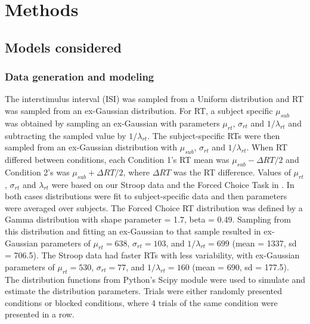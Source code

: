 \documentclass[titlepage,12pt] {article}
\begin{document}
\section*{Methods}

\subsection*{Models considered}

\subsubsection*{Data generation and modeling} 


The interstimulus interval (ISI) was sampled from a Uniform distribution and RT was sampled from an ex-Gaussian distribution.  For RT, a subject specific $\mu_{sub}$ was obtained by sampling an ex-Gaussian with parameters $\mu_{rt}$, $\sigma_{rt}$ and $1/\lambda_{rt}$ and subtracting the sampled value by $1/\lambda_{rt}$.  The subject-specific RTs were then sampled from an ex-Gaussian distribution with $\mu_{sub}$, $\sigma_{rt}$ and $1/\lambda_{rt}$.  
When RT differed between conditions, each Condition 1's RT mean was $\mu_{sub} - \Delta RT/2$ and Condition 2's was $\mu_{sub}+\Delta RT/2$, where $\Delta RT$ was the RT difference.  Values of $\mu_{rt}$, $\sigma_{rt}$ and $\lambda_{rt}$ were based on our Stroop data and the Forced Choice Task in \citet{grinband_detection_2008}.  In both cases distributions were fit to subject-specific data and then parameters were averaged over subjects.  The Forced Choice RT distribution was defined by a Gamma distribution with shape parameter = 1.7, beta = 0.49.  Sampling from this distribution and fitting an ex-Gaussian to that sample resulted in ex-Gaussian parameters of $\mu_{rt} = 638$, $\sigma_{rt} = 103$, and $1/\lambda_{rt} = 699$ (mean = 1337, sd = 706.5). The Stroop data had faster RTs with less variability, with ex-Gaussian parameters of  $\mu_{rt} =530$, $\sigma_{rt} = 77$, and $1/\lambda_{rt} = 160$ (mean = 690, sd = 177.5).  The distribution functions from Python's Scipy module were used to simulate and estimate the distribution parameters. Trials were either randomly presented conditions or blocked conditions, where 4 trials of the same condition were presented in a row.
 
\end{document}
